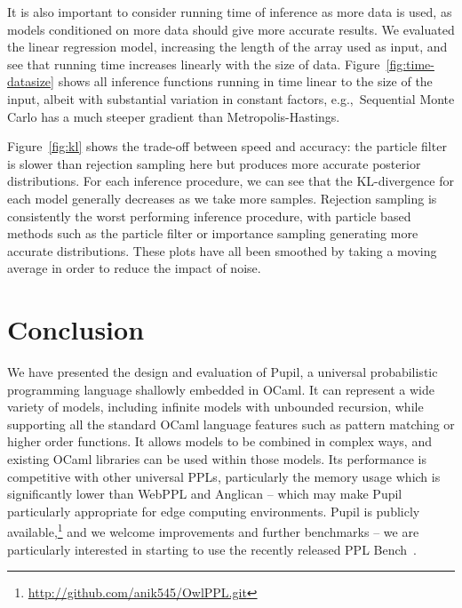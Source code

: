 \documentclass[sigconf]{acmart}
\newcommand{\pupil}{Pupil\xspace}
\begin{document}
It is also important to consider running time of inference as more data is used, as  models conditioned on more data should  give more accurate results. We evaluated  the linear regression model, increasing the length of the array used as input, and see that running time increases linearly with the size of data. Figure~\ref{fig:time-datasize} shows all inference functions running in time linear to the size of the input, albeit with substantial variation in constant factors, e.g.,~Sequential Monte Carlo has a much steeper gradient than Metropolis-Hastings.

\begin{figure*}
  \centering
  
  \caption{\label{fig:kl}
    Plot of KL-divergence with increasing number of samples for different models and inference procedures, averaged over 20 runs. We use log-log axes  due to large  variation between  the curves, which do map to straight lines on a linear axes.}
\end{figure*}

Figure~\ref{fig:kl} shows the trade-off between speed and accuracy: the particle filter is slower than rejection sampling here but produces more accurate posterior distributions. For each inference procedure, we can see that the KL-divergence for each model generally decreases as we take more samples. Rejection sampling is consistently the worst performing inference procedure, with particle based methods such as the particle filter or importance sampling generating more accurate distributions. These plots have all been smoothed by taking a moving average in order to reduce the impact of noise.

\section{Conclusion}
\label{s:conclusion}

We have presented the design and evaluation of \pupil, a universal probabilistic programming language shallowly embedded in OCaml. It can represent a wide variety of models, including infinite models with unbounded recursion, while supporting all the standard OCaml language features such as pattern matching or higher order functions. It allows models to be combined in complex ways, and existing OCaml libraries can be used within those models. Its performance is competitive with other universal PPLs, particularly the memory usage which is significantly lower than WebPPL and Anglican -- which may make \pupil particularly appropriate for edge computing environments. \pupil is publicly available,\footnote{\url{http://github.com/anik545/OwlPPL.git}} and we welcome improvements and further benchmarks -- we are particularly interested in starting to use the recently released PPL Bench~\cite{pplbench}.


{
  
  
}
\end{document}

